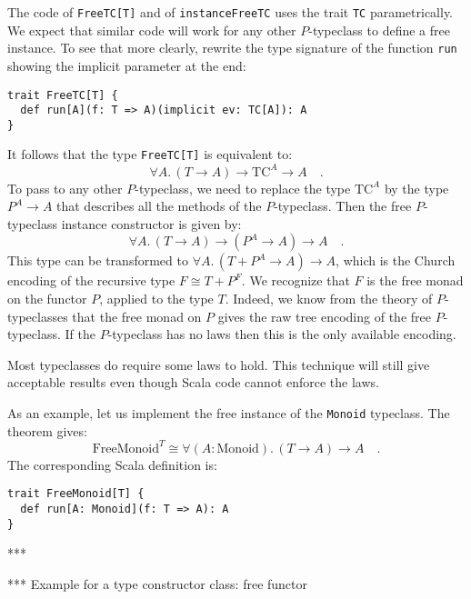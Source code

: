 The code of \lstinline!FreeTC[T]! and of \lstinline!instanceFreeTC!
uses the trait \lstinline!TC! parametrically. We expect that similar
code will work for any other $P$-typeclass to define a free instance.
To see that more clearly, rewrite the type signature of the function
\lstinline!run! showing the implicit parameter at the end:
\begin{lstlisting}
trait FreeTC[T] {
  def run[A](f: T => A)(implicit ev: TC[A]): A
}
\end{lstlisting}
It follows that the type \lstinline!FreeTC[T]! is equivalent to:
\[
\forall A.\,(T\rightarrow A)\rightarrow\text{TC}^{A}\rightarrow A\quad.
\]
To pass to any other $P$-typeclass, we need to replace the type $\text{TC}^{A}$
by the type $P^{A}\rightarrow A$ that describes all the methods of
the $P$-typeclass. Then the free $P$-typeclass instance constructor
is given by:
\[
\forall A.\,(T\rightarrow A)\rightarrow(P^{A}\rightarrow A)\rightarrow A\quad.
\]
This type can be transformed to $\forall A.\,(T+P^{A}\rightarrow A)\rightarrow A$,
which is the Church encoding of the recursive type $F\cong T+P^{F}$.
We recognize that $F$ is the free monad on the functor $P$, applied
to the type $T$. Indeed, we know from the theory of $P$-typeclasses
that the free monad on $P$ gives the raw tree encoding of the free
$P$-typeclass. If the $P$-typeclass has no laws then this is the
only available encoding.

Most typeclasses do require some laws to hold. This technique will
still give acceptable results even though Scala code cannot enforce
the laws. 

As an example, let us implement the free instance of the \lstinline!Monoid!
typeclass. The theorem gives:
\[
\text{FreeMonoid}^{T}\cong\forall(A:\text{Monoid}).\,(T\rightarrow A)\rightarrow A\quad.
\]
The corresponding Scala definition is:
\begin{lstlisting}
trait FreeMonoid[T] {
  def run[A: Monoid](f: T => A): A
}
\end{lstlisting}
{*}{*}{*}

{*}{*}{*} Example for a type constructor class: free functor


